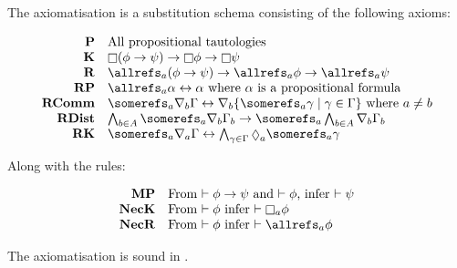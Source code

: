 \begin{definition}[\axiomKF]
The axiomatisation \axiomKF{} is a substitution schema consisting of the
following axioms:

$$
\begin{array}{rl}
{\bf P} & \text{All propositional tautologies}\\
{\bf K} & \knows (\phi \implies \psi) \implies \knows \phi \implies \knows
\psi\\
{\bf R} & \allrefs_a (\phi \implies \psi) \implies \allrefs_a \phi \implies
\allrefs_a \psi\\
{\bf RP} & \allrefs_a \alpha \iff \alpha \text{ where $\alpha$ is a
propositional formula}\\
{\bf RComm} & \somerefs_a \covers_b \Gamma \iff \covers_b \{\somerefs_a \gamma
\mid \gamma \in \Gamma\} \text{ where $a \neq b$}\\
{\bf RDist} & \bigwedge_{b \in A} \somerefs_a \covers_b \Gamma_b \implies
\somerefs_a \bigwedge_{b \in A} \covers_b \Gamma_b\\
{\bf RK} & \somerefs_a \covers_a \Gamma \iff \bigwedge_{\gamma \in \Gamma}
\suspects_a \somerefs_a \gamma\\
\end{array}
$$

Along with the rules:

$$
\begin{array}{rl}
{\bf MP} & \text{From $\proves \phi \implies \psi$ and $\proves \phi$, infer
$\proves \psi$}\\
{\bf NecK} & \text{From $\proves \phi$ infer $\proves \knows_a \phi$}\\
{\bf NecR} & \text{From $\proves \phi$ infer $\proves \allrefs_a \phi$}
\end{array}
$$
\end{definition}

\begin{lemma}\label{k-sound}
The axiomatisation \axiomKF{} is sound in \logicKF{}.
\end{lemma}

